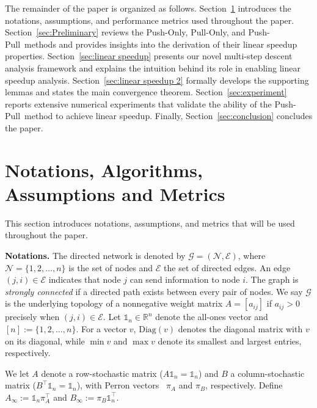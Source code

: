 \documentclass[10pt]{article}
\newcommand{\one}{\mathds{1}_n}
\newcommand{\pushonly}{{\sc Push-Only}\xspace}
\newcommand{\pushpull}{{\sc Push-Pull}\xspace}
\newcommand{\pullonly}{{\sc Pull-Only}\xspace}
\begin{document}
The remainder of the paper is organized as follows. Section~\ref{sec:notation} introduces the notations, assumptions, and performance metrics used throughout the paper. Section~\ref{sec:Preliminary} reviews the \pushonly, \pullonly, and \pushpull\ methods and provides insights into the derivation of their linear speedup properties. Section~\ref{sec:linear speedup} presents our novel multi-step descent analysis framework and explains the intuition behind its role in enabling linear speedup analysis. Section~\ref{sec:linear speedup 2} formally develops the supporting lemmas and states the main convergence theorem. Section~\ref{sec:experiment} reports extensive numerical experiments that validate the ability of the \pushpull\ method to achieve linear speedup. Finally, Section~\ref{sec:conclusion} concludes the paper.


\section{Notations, Algorithms, Assumptions and Metrics}\label{sec:notation}
This section introduces notations, assumptions, and metrics that will be used throughout the paper.

\textbf{Notations.} The directed network is denoted by $\mathcal{G} = (\mathcal{N}, \mathcal{E})$, where $\mathcal{N} = \{1,2,\ldots,n\}$ is the set of nodes and $\mathcal{E}$ the set of directed edges. An edge $(j,i)\in\mathcal{E}$ indicates that node $j$ can send information to node $i$. The graph is \textit{strongly connected} if a directed path exists between every pair of nodes. We say $\mathcal{G}$ is the underlying topology of a nonnegative weight matrix $A=[a_{ij}]$ if $a_{ij}>0$ precisely when $(j,i)\in\mathcal{E}$. Let $\one\in\mathbb{R}^n$ denote the all-ones vector and $[n]:=\{1,2,\ldots,n\}$. For a vector $v$, $\mathrm{Diag}(v)$ denotes the diagonal matrix with $v$ on its diagonal, while $\min v$ and $\max v$ denote its smallest and largest entries, respectively.

We let $A$ denote a row-stochastic matrix ($A\one=\one$) and $B$ a column-stochastic matrix ($B^\top\one=\one$), with Perron vectors~\cite{Perron1907} $\pi_A$ and $\pi_B$, respectively. Define $A_\infty := \one \pi_A^\top$ and $B_\infty := \pi_B \one^\top$. 
\end{document}

